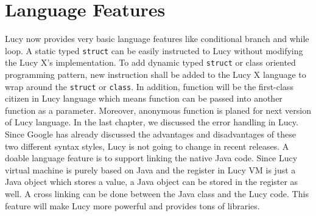 \section{Language Features}
Lucy now provides very basic language features like conditional branch and while loop. A static typed \texttt{struct} can be easily instructed to Lucy without modifying the Lucy X's implementation. To add dynamic typed \texttt{struct} or class oriented programming pattern, new instruction shall be added to the Lucy X language to wrap around the \texttt{struct} or \texttt{class}. In addition, function will be the first-class citizen in Lucy language which means function can be passed into another function as a parameter. Moreover, anonymous function is planed for next version of Lucy language.
In the last chapter, we discussed the error handling in Lucy. Since Google has already discussed the advantages and disadvantages of these two different syntax styles, Lucy is not going to change in recent releases.
A doable language feature is to support linking the native Java code. Since Lucy virtual machine is purely based on Java and the register in Lucy VM is just a Java object which stores a value, a Java object can be stored in the register as well. A cross linking can be done between the Java class and the Lucy code. This feature will make Lucy more powerful and provides tons of libraries. 
